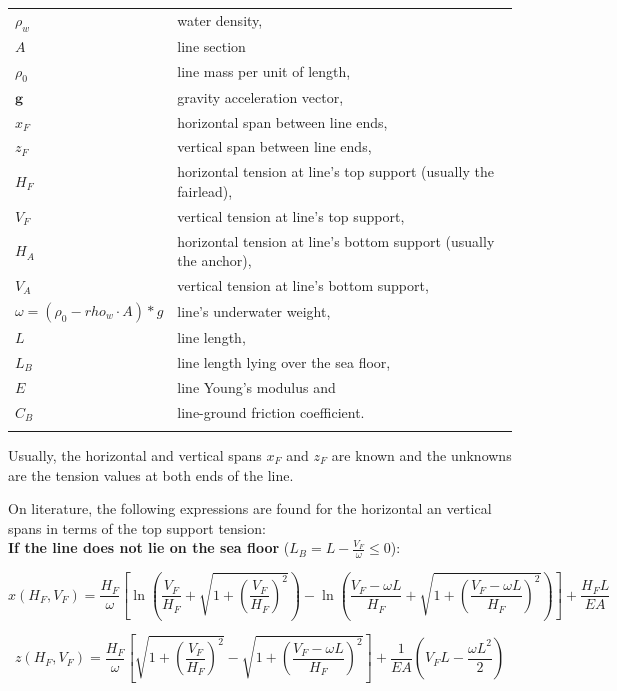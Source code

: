 \documentclass[10pt] {article}
\newcommand{\om}{\omega}
\begin{document}
\begin{tabular}{ll}
	$\rho_w$ & water density, \\ 
	$A$ & line section \\
	$\rho_0$ & line mass per unit of length, \\
	$\mathbf{g}$ & gravity acceleration vector, \\
	$x_{F}$ & horizontal span between line ends, \\
	$z_{F}$ & vertical span between line ends, \\
	$H_{F}$ & horizontal tension at line's top support (usually the fairlead), \\
	$V_{F}$ & vertical tension at line's top support, \\
	$H_{A}$ & horizontal tension at line's bottom support (usually the anchor), \\
	$V_{A}$ & vertical tension at line's bottom support, \\
	$\omega = (\rho_0-rho_w\cdot A)*g$ & line's underwater weight, \\
	$L$ & line length, \\
	$L_B$ & line length lying over the sea floor, \\
	$E$ & line Young's modulus and \\
	$C_{B}$ & line-ground friction coefficient. \\ \\
\end{tabular}

Usually, the horizontal and vertical spans $x_{F}$ and $z_{F}$ are known and the unknowns are the tension values at both ends of the line. 

\vspace{1cm}
On literature, the following expressions are found for the horizontal an vertical spans in terms of the top support tension:\\

\hspace{1cm}\textbf{If the line does not lie on the sea floor} ($L_B = L - \frac{V_F}{\omega} \leq 0$):

\begin{equation}
\nonumber
x(H_{F},V_{F}) = \frac{H_{F}}{\om} \left[ \ln \left( \frac{V_{F}}{H_{F}} + \sqrt{1+\left( \frac{V_{F}}{H_{F}} \right)^{2} } \right) - \ln \left( \frac{V_{F}-\om L}{H_{F}} + \sqrt{1+\left( \frac{V_{F}-\om L}{H_{F}} \right)^{2} } \right) \right] + \frac{H_{F} L}{EA}
\end{equation}

\begin{equation}
\nonumber
z(H_{F},V_{F}) = \frac{H_{F}}{\om} \left[\sqrt{1+\left( \frac{V_{F}}{H_{F}} \right)^{2} } - \sqrt{1+\left( \frac{V_{F}-\om L}{H_{F}} \right)^{2} } \right] + \frac{1}{EA} \left( V_{F} L - \frac{\om L^{2}}{2}\right)
\end{equation}
\end{document}
